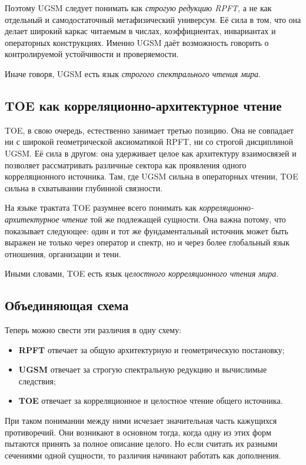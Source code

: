 \documentclass[12pt,a4paper]{article}
\begin{document}
Поэтому UGSM следует понимать как \textit{строгую редукцию RPFT}, а не как отдельный и самодостаточный метафизический универсум. Её сила в том, что она делает широкий каркас читаемым в числах, коэффициентах, инвариантах и операторных конструкциях. Именно UGSM даёт возможность говорить о контролируемой устойчивости и проверяемости.

Иначе говоря, UGSM есть язык \textit{строгого спектрального чтения мира}.

\subsection{TOE как корреляционно-архитектурное чтение}

TOE, в свою очередь, естественно занимает третью позицию. Она не совпадает ни с широкой геометрической аксиоматикой RPFT, ни со строгой дисциплиной UGSM. Её сила в другом: она удерживает целое как архитектуру взаимосвязей и позволяет рассматривать различные сектора как проявления одного корреляционного источника. Там, где UGSM сильна в операторных чтении, TOE сильна в схватывании глубинной связности.

На языке трактата TOE разумнее всего понимать как \textit{корреляционно-архитектурное чтение} той же подлежащей сущности. Она важна потому, что показывает следующее: один и тот же фундаментальный источник может быть выражен не только через оператор и спектр, но и через более глобальный язык отношения, организации и тени.

Иными словами, TOE есть язык \textit{целостного корреляционного чтения мира}.

\subsection{Объединяющая схема}

Теперь можно свести эти различия в одну схему:
\begin{itemize}
    \item \textbf{RPFT} отвечает за общую архитектурную и геометрическую постановку;
    \item \textbf{UGSM} отвечает за строгую спектральную редукцию и вычислимые следствия;
    \item \textbf{TOE} отвечает за корреляционное и целостное чтение общего источника.
\end{itemize}

При таком понимании между ними исчезает значительная часть кажущихся противоречий. Они возникают в основном тогда, когда одну из этих форм пытаются принять за полное описание целого. Но если считать их разными сечениями одной сущности, то различия начинают работать как дополнения.
\end{document}
